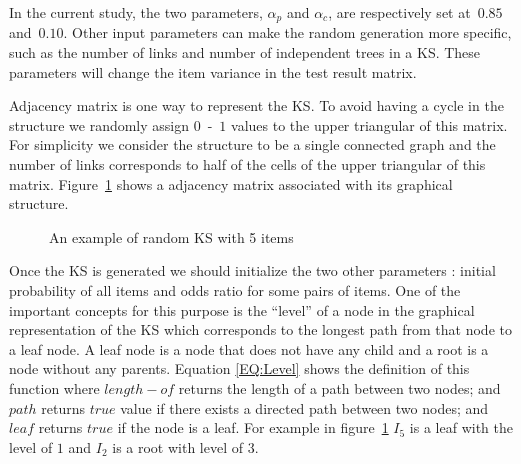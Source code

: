 In the current study, the two parameters, $\alpha_p$ and $\alpha_c$, are respectively set at~$0.85$ and~$0.10$. 
Other input parameters can make the random generation more specific, such as the number of links and number of independent trees in a KS. These parameters will change the item variance in the test result matrix. 

Adjacency matrix  is one way to represent the KS. To avoid having a cycle in the structure we randomly assign $0$~-~$1$ values to the upper triangular of this matrix. For simplicity we consider the structure to be a single connected graph and the number of links corresponds to half of the cells of the upper triangular of this matrix. Figure~\ref{fig:KSExample} shows a adjacency matrix associated with its graphical structure. 


\begin{figure}[h]
\centering 
{}
\qquad
\qquad
{}

\caption{An example of random KS with 5 items}
\label{fig:KSExample}
\end{figure}


Once the KS is generated we should initialize the two other parameters : initial probability of all items and odds ratio for some pairs of items. One of the important concepts for this purpose is the ``level'' of a node in the graphical representation of the KS which corresponds to the longest path from that node to a leaf node. A leaf node is a node that does not have any child and a root is a node without any parents. Equation \ref{EQ:Level} shows the definition of this function where $length-of$ returns the length of a path between two nodes; and $path$ returns $true$ value if there exists a directed path between two nodes; and $leaf$ returns $true$ if the node is a leaf.  For example in figure~\ref{fig:KSExample} $I_{5}$ is a leaf with the level of $1$ and $I_{2}$ is a root with level of $3$.

